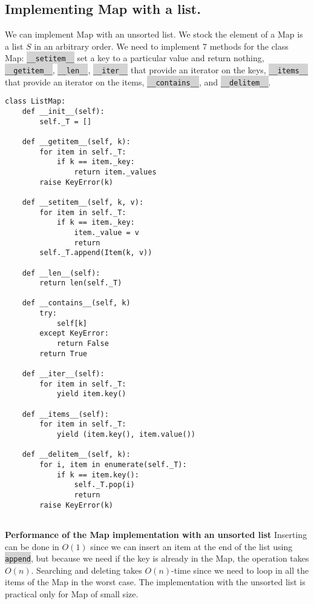 \documentclass[10pt]{article}
\newcommand{\code}[1]{{\small\colorbox{LightGray}{\texttt{#1}}}}
\begin{document}
\subsection{Implementing Map with a list.}
We can implement Map with an unsorted list. We stock the element of a Map is a list $S$ in an arbitrary order. We need to implement 7 methods for the class Map: \code{\_\_setitem\_\_} set a key to a particular value and return nothing, \code{\_\_getitem\_\_}, \code{\_\_len\_\_}, \code{\_\_iter\_\_} that provide an iterator on the keys, \code{\_\_items\_\_} that provide an iterator on the items, \code{\_\_contains\_\_}, and \code{\_\_delitem\_\_}. 
\begin{verbatim}
class ListMap:
    def __init__(self):
        self._T = []
        
    def __getitem__(self, k):
        for item in self._T:
            if k == item._key:
                return item._values
        raise KeyError(k)
        
    def __setitem__(self, k, v):
        for item in self._T:
            if k == item._key:
                item._value = v
                return
        self._T.append(Item(k, v))
    
    def __len__(self):
        return len(self._T)
        
    def __contains__(self, k)
        try: 
            self[k]
        except KeyError:
            return False
        return True
    
    def __iter__(self):
        for item in self._T:
            yield item.key()
    
    def __items__(self):
        for item in self._T:
            yield (item.key(), item.value())
    
    def __delitem__(self, k):
        for i, item in enumerate(self._T):
            if k == item.key():
                self._T.pop(i)
                return
        raise KeyError(k)
        
\end{verbatim}

\textbf{Performance of the Map implementation with an unsorted list} Inserting can be done in $O(1)$ since we can insert an item at the end of the list using \code{append}, but because we need if the key is already in the Map, the operation takes $O(n)$. Searching and deleting takes $O(n)$-time since we need to loop in all the items of the Map in the worst case. The implementation with the unsorted list is practical only for Map of small size.
\end{document}
